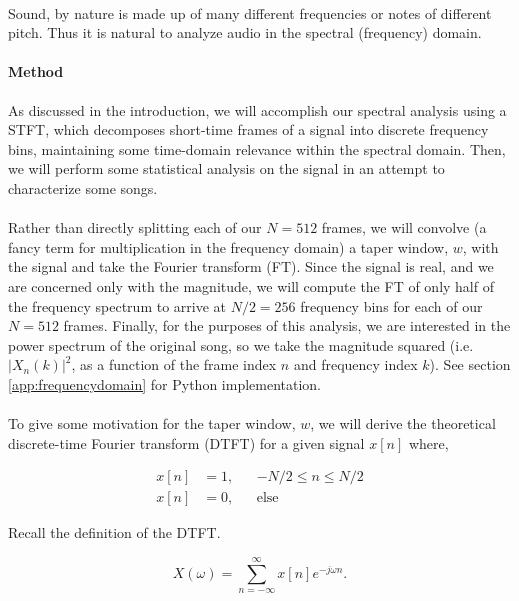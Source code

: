 \documentclass[11pt,a4paper]{article}
\begin{document}
\paragraph*{} Sound, by nature is made up of many different frequencies or notes of different pitch. Thus it is natural to analyze audio in the spectral (frequency) domain. 
\paragraph{Method} As discussed in the introduction, we will accomplish our spectral analysis using a STFT, which decomposes short-time frames of a signal into discrete frequency bins, maintaining some time-domain relevance within the spectral domain. Then, we will perform some statistical analysis on the signal in an attempt to characterize some songs.
\paragraph*{} Rather than directly splitting each of our $N=512$ frames, we will convolve (a fancy term for multiplication in the frequency domain) a taper window, $w$, with the signal and take the Fourier transform (FT). Since the signal is real, and we are concerned only with the magnitude, we will compute the FT of only half of the frequency spectrum to arrive at $N/2=256$ frequency bins for each of our $N=512$ frames. Finally, for the purposes of this analysis, we are interested in the power spectrum of the original song, so we take the magnitude squared (i.e. $|X_n(k)|^2$, as a function of the frame index $n$ and frequency index $k$). See section \ref{app:frequencydomain} for Python implementation.
\paragraph*{} To give some motivation for the taper window, $w$, we will derive the theoretical discrete-time Fourier transform (DTFT) for a given signal $x[n]$ where,

\begin{align*}
x[n] &= 1, && -N/2 \leq n \leq N/2 \\
x[n] &= 0, && \text{else}
\end{align*}

Recall the definition of the DTFT.

\begin{equation} \label{eq:dtft}
X(\omega)=\sum_{n=-\infty}^{\infty} x[n]e^{-j\omega n}.
\end{equation}
\end{document}
